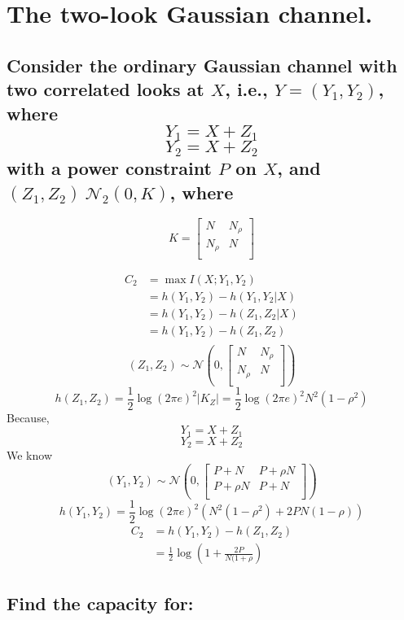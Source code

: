 \documentclass[11pt, oneside]{book}   	%
\begin{document}
\section{The two-look Gaussian channel.}
\subsection*{Consider the ordinary Gaussian channel with two correlated looks at $X$, i.e., $Y=(Y_1,Y_2)$, where
$$Y_1=X+Z_1$$
$$Y_2=X+Z_2$$
with a power constraint $P$ on $X$, and $(Z_1, Z_2)~\mathcal{N}_2(0,K)$, where
}
\[
K=
	\begin{bmatrix}
		N & N_{\rho} \\
		N_{\rho} & N \\
	\end{bmatrix}
\]

\begin{equation}
\begin{split}
	C_2 & = \max{I(X;Y_1,Y_2)}\\
	& = h(Y_1,Y_2) - h(Y_1,Y_2|X)\\
	& = h(Y_1,Y_2) - h(Z_1,Z_2|X)\\
	& = h(Y_1,Y_2) - h(Z_1,Z_2)\\
\end{split}
\end{equation}
\[
(Z_1,Z_2) \sim \mathcal{N}( 0,
\begin{bmatrix}
	N & N_{\rho}\\
	N_{\rho} & N\\
\end{bmatrix}
)
\]
$$h(Z_1,Z_2) = \frac{1}{2}\log{(2 \pi e)^2}|K_Z| = \frac{1}{2}\log{(2 \pi e)^2}N^2(1-\rho^2)$$
Because,
$$Y_1=X+Z_1$$
$$Y_2=X+Z_2$$
We know
\[
(Y_1,Y_2) \sim \mathcal{N} (0,
\begin{bmatrix}
	P+N & P+\rho N \\
	P+\rho N & P+N \\
\end{bmatrix}
)
\]
$$h(Y_1,Y_2)=\frac{1}{2}\log{(2\pi e)^2(N^2(1-\rho^2)+2PN(1-\rho))}$$
\begin{equation}
\begin{split}
C_2 & = h(Y_1,Y_2)-h(Z_1,Z_2)\\
& = \frac{1}{2}\log{(1+\frac{2P}{N(1+\rho})}
\end{split}
\end{equation}

\subsection*{Find the capacity for:}
\end{document}
